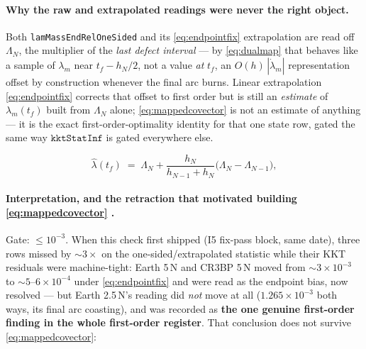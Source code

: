 \documentclass[11pt]{article}
\newcommand{\code}[1]{\texttt{#1}}
\begin{document}
\paragraph{Why the raw and extrapolated readings were never the right object.}
Both \code{lamMassEndRelOneSided} and its \eqref{eq:endpointfix} extrapolation
are read off $\Lambda_N$, the multiplier of the \emph{last defect interval} ---
by \eqref{eq:dualmap} that behaves like a sample of $\lambda_m$ near $t_f -
h_N/2$, not a value \emph{at} $t_f$, an $O(h)\,|\dot\lambda_m|$
representation offset by construction whenever the final arc burns. Linear
extrapolation \eqref{eq:endpointfix} corrects that offset to first order but
is still an \emph{estimate} of $\lambda_m(t_f)$ built from $\Lambda_N$ alone;
\eqref{eq:mappedcovector} is not an estimate of anything --- it is the exact
first-order-optimality identity for that one state row, gated the same way
$\code{kktStatInf}$ is gated everywhere else.

\begin{equation}
\widehat\lambda(t_f)\;=\;\Lambda_N+\frac{h_N}{h_{N-1}+h_N}
\bigl(\Lambda_N-\Lambda_{N-1}\bigr),
\label{eq:endpointfix}
\end{equation}

\paragraph{Interpretation, and the retraction that motivated building
\eqref{eq:mappedcovector} .}
Gate: $\le 10^{-3}$. When this check first shipped (I5 fix-pass block, same
date), three rows missed by $\sim3\times$ on the one-sided/extrapolated
statistic while their KKT residuals were machine-tight: Earth 5\,N and CR3BP
5\,N moved from $\sim3\times10^{-3}$ to $\sim5$--$6\times10^{-4}$ under
\eqref{eq:endpointfix} and were read as the endpoint bias, now resolved ---
but Earth 2.5\,N's reading did \emph{not} move at all
($1.265\times10^{-3}$ both ways, its final arc coasting), and was recorded as
\textbf{the one genuine first-order finding in the whole first-order
register}. That conclusion does not survive \eqref{eq:mappedcovector}:
\end{document}
